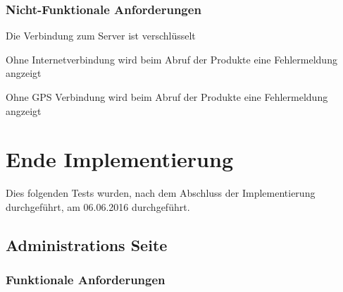 \subsubsection{Nicht-Funktionale Anforderungen}
\begin{todolist}
	\item Die Verbindung zum Server ist verschlüsselt
	\item Ohne Internetverbindung wird beim Abruf der Produkte eine Fehlermeldung angzeigt
	\item Ohne GPS Verbindung wird beim Abruf der Produkte eine Fehlermeldung angzeigt
\end{todolist}



\section{Ende Implementierung}

Dies folgenden Tests wurden, nach dem Abschluss der Implementierung durchgeführt, am 06.06.2016 durchgeführt.

\subsection{Administrations Seite}
\subsubsection{Funktionale Anforderungen}


